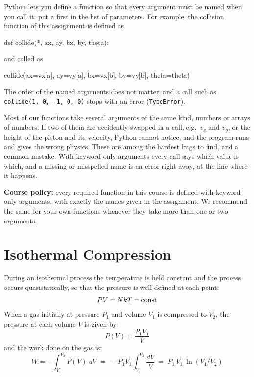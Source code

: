 \documentclass[12pt]{article}
\begin{document}
\noindent
Python lets you define a function so that every argument must be named when you call it: put a
{\tt *} first in the list of parameters.  For example, the collision function of this
assignment is defined as
\begin{python}
def collide(*, ax, ay, bx, by, theta):
\end{python}
and called as
\begin{python}
collide(ax=vx[a], ay=vy[a], bx=vx[b], by=vy[b], theta=theta)
\end{python}
The order of the named arguments does not matter, and a call such as {\tt collide(1, 0, -1, 0, 0)}
stops with an error ({\tt TypeError}).

Most of our functions take several arguments of the same kind, numbers
or arrays of numbers.  If two of them are accidently swapped in a
call, e.g.\ $v_x$ and $v_y$, or the height of the piston and its
velocity, Python cannot notice, and the program runs and gives the
wrong physics.  These are among the hardest bugs to find, and a common
mistake.  With keyword-only arguments every call says which value is
which, and a missing or misspelled name is an error right away, at the
line where it happens.

{\bf Course policy:} every required function in this course is defined
with keyword-only arguments, with exactly the names given in the
assignment.  We recommend the same for your own functions whenever
they take more than one or two arguments.

\section{Isothermal Compression}

During an isothermal process the temperature is held constant and the process occurs quasistatically, so that the pressure is well-defined at each point:
$$PV = NkT = \rm const$$
When a gas initially at pressure $P_1$ and volume $V_1$ is compressed to $V_2$, the pressure at each volume $V$ is given by:
$$P(V) = \frac{P_1 V_1}{V}$$
and the work done on the gas is:
$$W = - \int_{V_1}^{V_2} P(V) \; dV \; = \; - P_1 V_1 \int_{V_1}^{V_2} \frac{dV}{V} \; = \; P_1 \,V_1 \; \ln (V_1 / V_2)$$
\end{document}
